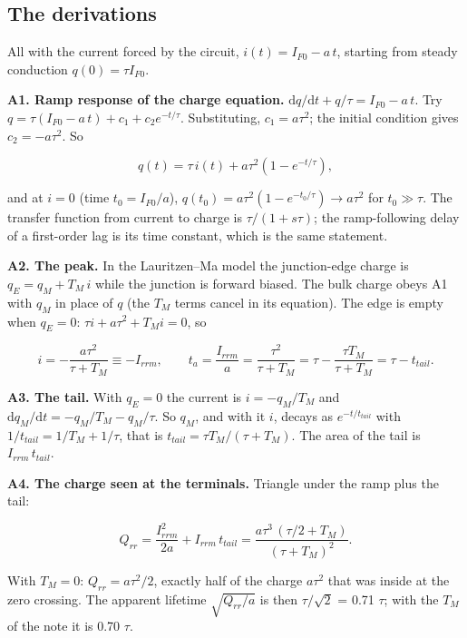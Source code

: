 \documentclass[11pt,a4paper,numbers=noenddot]{scrartcl}
\begin{document}
\begin{onehalfspace}
\appendix

\section{The derivations}\label{the-derivations}

All with the current forced by the circuit, \(i(t) = I_{F0} - a\,t\), starting from steady conduction \(q(0) = \tau I_{F0}\).

\textbf{A1. Ramp response of the charge equation.} \(\mathrm{d}q/\mathrm{d}t + q/\tau = I_{F0} - a\,t\). Try \(q = \tau(I_{F0} - a\,t) + c_1 + c_2 e^{-t/\tau}\). Substituting, \(c_1 = a\tau^2\); the initial condition gives \(c_2 = -a\tau^2\). So

\[q(t) = \tau\, i(t) + a\tau^2\left(1 - e^{-t/\tau}\right),\]

and at \(i = 0\) (time \(t_0 = I_{F0}/a\)), \(q(t_0) = a\tau^2 (1 - e^{-t_0/\tau}) \to a\tau^2\) for \(t_0 \gg \tau\). The transfer function from current to charge is \(\tau/(1 + s\tau)\); the ramp-following delay of a first-order lag is its time constant, which is the same statement.

\textbf{A2. The peak.} In the Lauritzen--Ma model the junction-edge charge is \(q_E = q_M + T_M\, i\) while the junction is forward biased. The bulk charge obeys A1 with \(q_M\) in place of \(q\) (the \(T_M\) terms cancel in its equation). The edge is empty when \(q_E = 0\): \(\tau i + a\tau^2 + T_M i = 0\), so

\[i = -\frac{a\tau^2}{\tau + T_M} \equiv -I_{rrm}, \qquad t_a = \frac{I_{rrm}}{a} = \frac{\tau^2}{\tau + T_M} = \tau - \frac{\tau T_M}{\tau + T_M} = \tau - t_{tail}.\]

\textbf{A3. The tail.} With \(q_E = 0\) the current is \(i = -q_M/T_M\) and \(\mathrm{d}q_M/\mathrm{d}t = -q_M/T_M - q_M/\tau\). So \(q_M\), and with it \(i\), decays as \(e^{-t/t_{tail}}\) with \(1/t_{tail} = 1/T_M + 1/\tau\), that is \(t_{tail} = \tau T_M/(\tau + T_M)\). The area of the tail is \(I_{rrm}\, t_{tail}\).

\textbf{A4. The charge seen at the terminals.} Triangle under the ramp plus the tail:

\[Q_{rr} = \frac{I_{rrm}^2}{2a} + I_{rrm}\, t_{tail} = \frac{a\tau^3\,(\tau/2 + T_M)}{(\tau + T_M)^2}.\]

With \(T_M = 0\): \(Q_{rr} = a\tau^2/2\), exactly half of the charge \(a\tau^2\) that was inside at the zero crossing. The apparent lifetime \(\sqrt{Q_{rr}/a}\) is then \(\tau/\sqrt{2}\) = 0.71 \(\tau\); with the \(T_M\) of the note it is 0.70 \(\tau\).


\end{onehalfspace}
\end{document}
